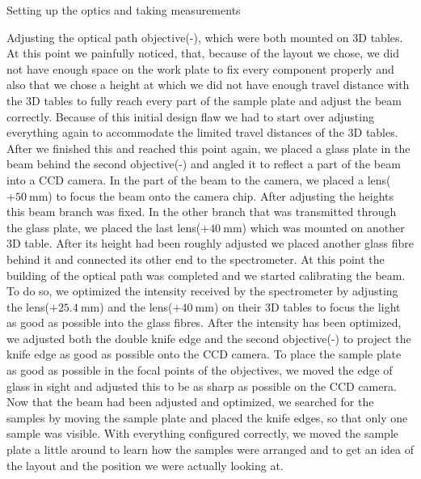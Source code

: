 \documentclass[pdftex, a4paper,11pt, twoside, UKenglish]{report}
\begin{document}
\begin{chapter}{Setting up the optics and taking measurements}
\begin{section}{Adjusting the optical path}
      objective(-), which were both mounted on 3D tables. At this point we
      painfully noticed, that, because of the layout we chose, we did not have
      enough space on the work plate to fix every component properly and also
      that we chose a height at which we did not have enough travel distance
      with the 3D tables to fully reach every part of the sample plate and
      adjust the beam correctly. Because of this initial design flaw we had to
      start over adjusting everything again to accommodate the limited
      travel distances of the 3D tables. \newline
      After we finished this and reached this point again, we placed a glass
      plate in the beam behind the second objective(-) and angled it to
      reflect a part of the beam into a CCD camera. In the part of the beam
      to the camera, we placed a lens($+\SI{50}{\milli\meter}$) to focus the
      beam onto the camera chip. After adjusting the heights this beam branch
      was fixed.\newline
      In the other branch that was transmitted through the glass plate, we
      placed the last lens($+\SI{40}{\milli\meter}$) which was mounted on
      another 3D table. After its height had been roughly adjusted we placed
      another glass fibre behind it and connected its other end to the
      spectrometer. \newline
      At this point the building of the optical path was completed
      and we started calibrating the beam. To do so, we optimized the intensity
      received by the spectrometer by adjusting the
      lens($+\SI{25.4}{\milli\meter}$) and the lens($+\SI{40}{\milli\meter}$)
      on their 3D tables to focus the light as good as possible into the glass
      fibres. After the intensity has been optimized, we adjusted both the
      double knife edge and the second objective(-) to project the knife edge
      as good as possible onto the CCD camera. To place the sample plate as good
      as possible in the focal points of the objectives, we moved the edge of
      glass in sight and adjusted this to be as sharp as possible on the CCD
      camera. \newline
      Now that the beam had been adjusted and optimized, we searched for the
      samples by moving the sample plate and placed the knife edges, so that
      only one sample was visible. \newline
      With everything configured correctly, we moved the sample plate a little
      around to learn how the samples were arranged and to get an idea of the
      layout and the position we were actually looking at.
      \vfill
    \end{section}
    

\end{chapter}
\end{document}
